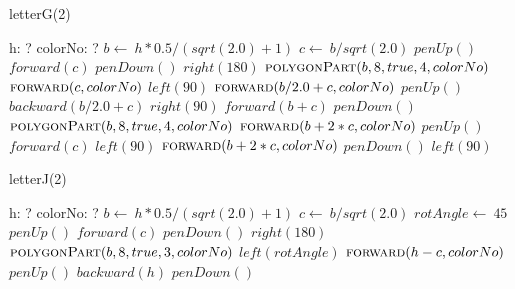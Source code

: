 \documentclass[a4paper,10pt]{article}
\begin{document}
\begin{algorithm}
\caption{letterG(2)}
\begin{algorithmic}[5]
\State {}
\State {}
    \State h: ?
    \State colorNo: ?
  \EndDecl
  \State \(b\gets\ h*0.5/(sqrt(2.0)+1)\)
  \State \(c\gets\ b/sqrt(2.0)\)
  \State \(penUp()\)
  \State \(forward(c)\)
  \State \(penDown()\)
  \State \(right(180)\)
  \State {}
  \State {}
  \State \(\Call{polygonPart}{b,8,true,4,colorNo}\)
  \State \(\Call{forward}{c,colorNo}\)
  \State \(left(90)\)
  \State \(\Call{forward}{b/2.0+c,colorNo}\)
  \State \(penUp()\)
  \State \(backward(b/2.0+c)\)
  \State \(right(90)\)
  \State \(forward(b+c)\)
  \State \(penDown()\)
  \State {}
  \State {}
  \State \(\Call{polygonPart}{b,8,true,4,colorNo}\)
  \State \(\Call{forward}{b+2*c,colorNo}\)
  \State \(penUp()\)
  \State \(forward(c)\)
  \State \(left(90)\)
  \State \(\Call{forward}{b+2*c,colorNo}\)
  \State \(penDown()\)
  \State \(left(90)\)
\EndProcedure
\end{algorithmic}
\end{algorithm}


\begin{algorithm}
\caption{letterJ(2)}
\begin{algorithmic}[5]
\State {}
\State {}
    \State h: ?
    \State colorNo: ?
  \EndDecl
  \State \(b\gets\ h*0.5/(sqrt(2.0)+1)\)
  \State \(c\gets\ b/sqrt(2.0)\)
  \State \(rotAngle\gets\ 45\)
  \State \(penUp()\)
  \State \(forward(c)\)
  \State \(penDown()\)
  \State \(right(180)\)
  \State {}
  \State {}
  \State \(\Call{polygonPart}{b,8,true,3,colorNo}\)
  \State \(left(rotAngle)\)
  \State \(\Call{forward}{h-c,colorNo}\)
  \State \(penUp()\)
  \State \(backward(h)\)
  \State \(penDown()\)
\EndProcedure
\end{algorithmic}
\end{algorithm}
\end{document}
